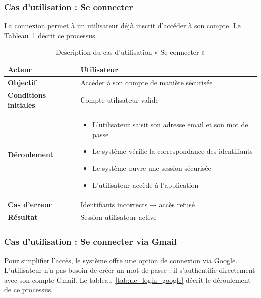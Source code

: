 \subsubsection{Cas d’utilisation : Se connecter}

La connexion permet à un utilisateur déjà inscrit d’accéder à son compte. Le Tableau~\ref{tab:uc_login} décrit ce processus.

\begin{table}[H]
\centering
\renewcommand{\arraystretch}{1.2}
\begin{tabular}{|p{4cm}|p{10cm}|}
\hline
\textbf{Acteur} & Utilisateur \\ \hline

\textbf{Objectif} & Accéder à son compte de manière sécurisée \\ \hline

\textbf{Conditions initiales} & Compte utilisateur valide \\ \hline

\textbf{Déroulement} &
\begin{itemize}
    \item L’utilisateur saisit son adresse email et son mot de passe
    \item Le système vérifie la correspondance des identifiants
    \item Le système ouvre une session sécurisée
    \item L’utilisateur accède à l’application
\end{itemize} \\ \hline

\textbf{Cas d’erreur} & Identifiants incorrects → accès refusé \\ \hline

\textbf{Résultat} & Session utilisateur active \\ \hline
\end{tabular}
\caption{Description du cas d’utilisation « Se connecter »}
\label{tab:uc_login}
\end{table}

\subsubsection{Cas d’utilisation : Se connecter via Gmail}

Pour simplifier l’accès, le système offre une option de connexion via Google. L’utilisateur n’a pas besoin de créer un mot de passe ; il s’authentifie directement avec son compte Gmail. Le tableau~\ref{tab:uc_login_google} décrit le déroulement de ce processus.

